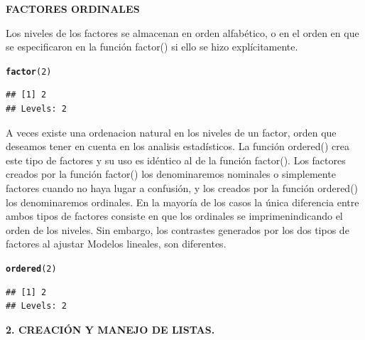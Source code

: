 \documentclass[12pt,letterpaper]{article}\usepackage[]{graphicx}\usepackage[]{color}
\makeatletter
\newcommand{\hlnum}[1]{\textcolor[rgb]{0.686,0.059,0.569}{#1}}%
\newcommand{\hlstd}[1]{\textcolor[rgb]{0.345,0.345,0.345}{#1}}%
\newcommand{\hlkwd}[1]{\textcolor[rgb]{0.737,0.353,0.396}{\textbf{#1}}}%
\newenvironment{kframe}{%
 \def\at@end@of@kframe{}%
 \ifinner\ifhmode%
  \def\at@end@of@kframe{\end{minipage}}%
  \begin{minipage}{\columnwidth}%
 \fi\fi%
 \def\FrameCommand##1{\hskip\@totalleftmargin \hskip-\fboxsep
 \colorbox{shadecolor}{##1}\hskip-\fboxsep
     \hskip-\linewidth \hskip-\@totalleftmargin \hskip\columnwidth}%
 \MakeFramed {\advance\hsize-\width
   \@totalleftmargin\z@ \linewidth\hsize
   \@setminipage}}%
 {\par\unskip\endMakeFramed%
 \at@end@of@kframe}
\newenvironment{knitrout}{}{} %
\makeatother
\begin{document}
\begin{center}
\textbf{FACTORES ORDINALES}
\end{center}

Los niveles de los factores se almacenan en orden alfab\'etico, o en el orden en que se especificaron en la funci\'on factor() si ello se hizo expl\'icitamente. 
\begin{knitrout}
\color{fgcolor}\begin{kframe}
\begin{alltt}
\hlkwd{factor}\hlstd{(}\hlnum{2}\hlstd{)}
\end{alltt}
\begin{verbatim}
## [1] 2
## Levels: 2
\end{verbatim}
\end{kframe}
\end{knitrout}

A veces existe una ordenacion natural en los niveles de un factor, orden que deseamos tener en cuenta en los analisis estadísticos. La funci\'on ordered() crea este tipo de factores y su uso es id\'entico al de la funci\'on factor(). Los factores creados por la funci\'on factor() los denominaremos nominales o simplemente factores cuando no haya lugar a confusi\'on, y los creados por la funci\'on ordered() los denominaremos ordinales. En la mayor\'ia de los casos la \'unica diferencia entre ambos tipos de factores consiste en que los ordinales se imprimenindicando el orden de los niveles. Sin embargo, los contrastes generados por los dos tipos de factores al ajustar Modelos lineales, son diferentes. 
\begin{knitrout}
\color{fgcolor}\begin{kframe}
\begin{alltt}
\hlkwd{ordered}\hlstd{(}\hlnum{2}\hlstd{)}
\end{alltt}
\begin{verbatim}
## [1] 2
## Levels: 2
\end{verbatim}
\end{kframe}
\end{knitrout}

\begin{center}
\textbf{2.  CREACI\'ON Y MANEJO DE LISTAS.}
\end{center}
\end{document}
